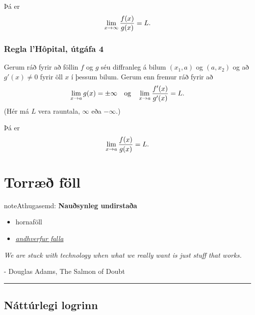 \documentclass[b5paper,10pt,icelandic]{sphinxmanual}
\begin{document}
Þá er
\begin{gather}
\begin{split}\lim_{x\rightarrow \infty}\frac{f(x)}{g(x)}=L.\end{split}\notag
\end{gather}

\subsection{Regla l’Hôpital, útgáfa 4}
\label{kafli03:regla-lhopital-utgafa-4}
Gerum ráð fyrir að föllin \(f\) og \(g\) séu diffranleg á bilum
\((x_1, a)\) og \((a, x_2)\) og að \(g'(x)\neq 0\) fyrir öll
\(x\) í þessum bilum. Gerum enn fremur ráð fyrir að
\begin{gather}
\begin{split}\lim_{x\rightarrow a}g(x)=\pm\infty
\quad\mbox{og}\quad \lim_{x\rightarrow a}\frac{f'(x)}{g'(x)}=L.\end{split}\notag
\end{gather}
(Hér má \(L\) vera rauntala, \(\infty\) eða \(-\infty\).)

Þá er
\begin{gather}
\begin{split}\lim_{x\rightarrow a}\frac{f(x)}{g(x)}=L.\end{split}\notag
\end{gather}

\chapter{Torræð föll}
\label{kafli04::doc}\label{kafli04:torrae-foll}
\begin{notice}{note}{Athugasemd:}
\textbf{Nauðsynleg undirstaða}
\begin{itemize}
\item {} 
hornaföll

\item {} 
{\hyperref[kafli01:andhverfa]{\emph{andhverfur falla}}}

\end{itemize}
\end{notice}

\emph{We are stuck with technology when what we really want is just stuff that works.}

- Douglas Adams, The Salmon of Doubt


\bigskip\hrule{}\bigskip



\section{Náttúrlegi logrinn}
\label{kafli04:natturlegi-logrinn}
\end{document}
